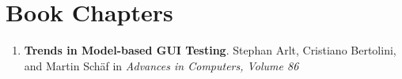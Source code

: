 \section{\sc Book Chapters}

\begin{enumerate} \setcounter{enumi}{\value{saveenum}}

  \item \textbf{Trends in Model-based GUI Testing}. Stephan Arlt, Cristiano Bertolini, and Martin Schäf in \emph{Advances in Computers, Volume 86}
  
 \setcounter{saveenum}{\value{enumi}} 
\end{enumerate}

